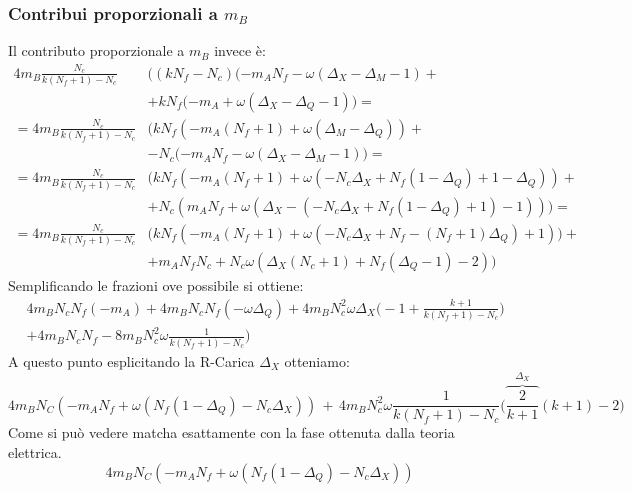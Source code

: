 \documentclass[a4paper,12pt]{article}
\begin{document}
\subsubsection{Contribui  proporzionali a $m_B$}
Il contributo proporzionale a $m_B$ invece è:
\begin{align*}
 4 m_B \frac{N_c}{k(N_f+1)-N_c} & \bigg( (k N_f - N_c ) ( -m_A N_f - \omega ( \Delta_X - \Delta_M -1) +\\
 & +  k N_f ( -m_A + \omega ( \Delta_X - \Delta_Q -1) \bigg) = \\
 =   4 m_B \frac{N_c}{k(N_f+1)-N_c} & \bigg ( k N_f ( - m_A (N_f+1)  +\omega( \Delta_M - \Delta_Q)) +\\
 & - N_c ( - m_A N_f - \omega( \Delta_X - \Delta_M-1) \bigg) = \\
 = 4 m_B \frac{N_c}{k(N_f+1)-N_c} & \bigg ( k N_f ( - m_A (N_f+1) + \omega ( - N_c \Delta_X + N_f( 1- \Delta_Q) + 1  - \Delta_Q) ) + \\
 & + N_c (  m_A N_f +  \omega( \Delta_X - (- N_c \Delta_X + N_f( 1- \Delta_Q) + 1)-1) ) \bigg) = \\
  =  4 m_B \frac{N_c}{k(N_f+1)-N_c} & \bigg ( k N_f ( - m_A (N_f+1) +\omega( - N_c \Delta_X + N_f - (N_f+1) \Delta_Q) + 1)) +\\
  & + m_A N_f N_c   + N_c \omega  (    \Delta_X (N_c+1) + N_f( \Delta_Q - 1) - 2) \bigg)
\end{align*}
Semplificando le frazioni ove possibile si ottiene:
\begin{align*}
& 4 m_B N_c N_f (-m_A) + 4 m_B N_c N_f ( - \omega \Delta_Q)  + 4 m_B N_c^2 \omega \Delta_X \bigg(- 1 + \frac{k+1}{k (N_f+1)-N_c} \bigg) \\
& + 4 m_B N_c N_f   -8m_B N_c^2 \omega \frac{1}{k (N_f+1) - N_c}  \bigg)
\end{align*}
A questo punto esplicitando la R-Carica $\Delta_X$ otteniamo:
\begin{equation}
	4 m_B N_C ( - m_A N_f + \omega ( N_f ( 1 - \Delta_Q) - N_c \Delta_X )) \, + \, 4 m_B N_c^2 \omega \frac{1}{k (N_f+1)-N_c} \bigg( \overbrace{\frac{2}{k+1}}^{\Delta_X} (k+1) - 2 \bigg) 	
\end{equation}
Come si può vedere matcha esattamente con la fase ottenuta dalla teoria elettrica.
\begin{equation}
4 m_B N_C ( - m_A N_f + \omega ( N_f ( 1 - \Delta_Q) - N_c \Delta_X ))
\end{equation}
\end{document}
